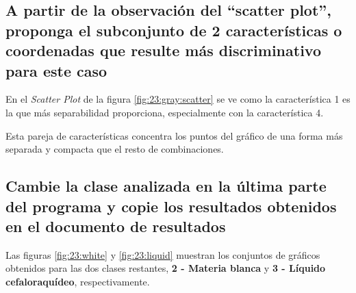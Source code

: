 \documentclass[11pt]{article} %
\begin{document}
\subsection[Subconjuntos]{A partir de la observación del “scatter plot”, proponga el subconjunto de 2 características o coordenadas que resulte más discriminativo para este caso}

En el \emph{Scatter Plot} de la figura \ref{fig:23:gray:scatter} se ve como la característica 1 es la que más separabilidad proporciona, especialmente con la característica 4.

Esta pareja de características concentra los puntos del gráfico de una forma más separada y compacta que el resto de combinaciones.

\subsection[Cambiar clases]{Cambie la clase analizada en la última parte del programa y copie los resultados obtenidos en el documento de resultados}

Las figuras \ref{fig:23:white} y \ref{fig:23:liquid} muestran los conjuntos de gráficos obtenidos para las dos clases restantes, \textbf{2 - Materia blanca} y \textbf{3 - Líquido cefaloraquídeo}, respectivamente.
\end{document}

